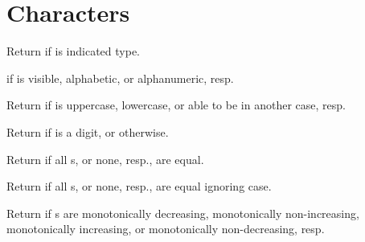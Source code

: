 %
%

\section{Characters} 

\begin{LIST}{1cm}

  Return \retval{\T} if  is indicated type.

  \retval{\T} if  is visible, alphabetic, or
  alphanumeric, resp.

  Return \retval{\T} if  is uppercase, lowercase, or
  able to be in another case, resp.

  Return  if  is a digit, or
  \retval{\NIL} otherwise.

  Return \retval{\T} if all s, or
  none, resp.,  are equal.

  Return \retval{\T} if all s, or
  none, resp.,  are equal ignoring case.

  Return \retval{\T} if s are
  monotonically decreasing, monotonically non-increasing, monotonically
  increasing, or monotonically non-decreasing, resp.


\end{LIST}
